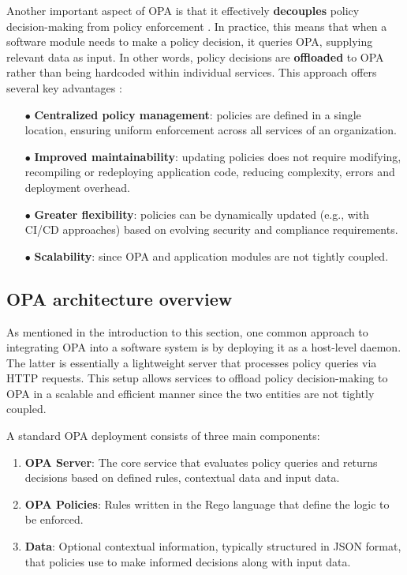 Another important aspect of OPA is that it effectively \textbf{decouples} policy decision-making from policy enforcement \cite{opa_docs}.
In practice, this means that when a software module needs to make a policy decision, it queries OPA, supplying relevant data as input. 
In other words, policy decisions are \textbf{offloaded} to OPA rather than being hardcoded within individual services. 
This approach offers several key advantages \cite{opa_docs}:
\begin{itemize}[itemsep=0.2pt, topsep=1pt]
  \item[$\bullet$] \textbf{Centralized policy management}: policies are defined in a single location, ensuring uniform enforcement across all services of an organization.
  \item[$\bullet$] \textbf{Improved maintainability}: updating policies does not require modifying, recompiling or redeploying application code, reducing complexity, errors and deployment overhead.
  \item[$\bullet$] \textbf{Greater flexibility}: policies can be dynamically updated (e.g., with CI/CD approaches) based on evolving security and compliance requirements. 
  \item[$\bullet$] \textbf{Scalability}: since OPA and application modules are not tightly coupled.
\end{itemize} 

\subsection{OPA architecture overview}

As mentioned in the introduction to this section, one common approach to integrating OPA into a software system is by deploying it as a host-level daemon. 
The latter is essentially a lightweight server that processes policy queries via HTTP requests. 
This setup allows services to offload policy decision-making to OPA in a scalable and efficient manner since the two entities are not tightly coupled.

A standard OPA deployment consists of three main components:

\begin{enumerate}[itemsep=0.2pt, topsep=1pt]
  \item \textbf{OPA Server}: The core service that evaluates policy queries and returns decisions based on defined rules, contextual data and input data.
  \item \textbf{OPA Policies}: Rules written in the Rego language that define the logic to be enforced.
  \item \textbf{Data}: Optional contextual information, typically structured in JSON format, that policies use to make informed decisions along with input data.
\end{enumerate}

